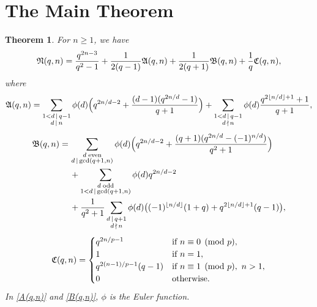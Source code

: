 \documentclass{amsart}
\newtheorem{thm}{Theorem}[section]
\numberwithin{equation}{section}
\theoremstyle{definition}
\begin{document}

\section{The Main Theorem}

\begin{thm}\label{T-main} 
For $n\ge 1$, we have 
\begin{equation}\label{6.1}
\frak N(q,n)=\frac{q^{2n-3}}{q^2-1}+\frac 1{2(q-1)}\frak A(q,n)+\frac 1{2(q+1)}\frak B(q,n)+\frac 1q\frak C(q,n),
\end{equation}
where
\begin{equation}\label{A(q,n)}
\frak A(q,n)=\sum_{\substack{1<d\,\mid\, q-1\cr d\,\mid\, n}}\phi(d)\Bigl(q^{2n/d-2}+\frac{(d-1)(q^{2n/d}-1)}{q+1}\Bigr)+\sum_{\substack{1<d\,\mid\, q-1\cr d\,\nmid\, n}}\phi(d)\frac{q^{2\lfloor n/d\rfloor+1}+1}{q+1},
\end{equation}
\begin{align}\label{B(q,n)}
\frak B(q,n)=\,&\sum_{\substack{d\; \text{\rm even}\cr d\,\mid\,\text{\rm gcd}(q+1,n)}}\phi(d)\Bigl(q^{2n/d-2}+\frac{(q+1)(q^{2n/d}-(-1)^{n/d})}{q^2+1}\Bigr)\\
&+\sum_{\substack{d\; \text{\rm odd}\cr 1<d\,\mid\,\text{\rm gcd}(q+1,n)}}\phi(d)q^{2n/d-2}\cr
&+\frac 1{q^2+1}\sum_{\substack{d\,\mid\, q+1\cr d\,\nmid\, n}}\phi(d)\bigl((-1)^{\lfloor n/d\rfloor}(1+q)+q^{2\lfloor n/d\rfloor+1}(q-1)\bigr),\nonumber
\end{align}
\begin{equation}\label{C(q,n)}
\frak C(q,n)=\begin{cases}
q^{2n/p-1}&\text{if}\ n\equiv 0\pmod p,\cr
1&\text{if}\ n=1,\cr
q^{2(n-1)/p-1}(q-1)&\text{if}\ n\equiv 1\pmod p,\ n>1,\cr
0&\text{otherwise}.
\end{cases}
\end{equation}
In \eqref{A(q,n)} and \eqref{B(q,n)}, $\phi$ is the Euler function.
\end{thm}
\end{document}
